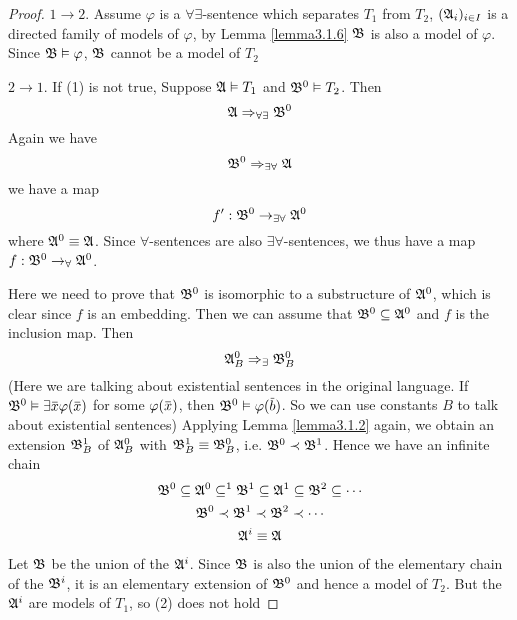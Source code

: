 \documentclass[11pt]{article}
\begin{document}
\begin{proof}
\(1\to 2\). Assume \(\varphi\) is a \(\forall\exists\)-sentence which separates \(T_1\) from \(T_2\), \((\mathfrak{A}_i)_{i\in I}\) is a
directed family of models of \(\varphi\), by Lemma \ref{lemma3.1.6} \(\mathfrak{B}\) is also a model of \(\varphi\).
Since \(\mathfrak{B}\vDash\varphi\), \(\mathfrak{B}\) cannot be a model of \(T_2\)

\(2\to1\). If (1) is not true, Suppose \(\mathfrak{A}\vDash T_1\) and \(\mathfrak{B}^0\vDash T_2\). Then
\begin{equation*}
\mathfrak{A}\Rightarrow_{\forall\exists}\mathfrak{B}^0
\end{equation*}
Again we have
\begin{equation*}
\mathfrak{B}^0\Rightarrow_{\exists\forall}\mathfrak{A}
\end{equation*}
we have a map
\begin{equation*}
f':\mathfrak{B}^0\to_{\exists\forall}\mathfrak{A}^0
\end{equation*}
where \(\mathfrak{A}^0\equiv\mathfrak{A}\). Since \(\forall\)-sentences are also \(\exists\forall\)-sentences, we thus have a map \(f:\mathfrak{B}^0\to_{\forall}\mathfrak{A}^0\).

Here we need to prove that \(\mathfrak{B}^0\) is isomorphic to a substructure of \(\mathfrak{A}^0\), which is clear
since \(f\) is an embedding.
Then we can assume that \(\mathfrak{B}^0\subseteq\mathfrak{A}^0\) and \(f\) is the inclusion map. Then
\begin{equation*}
\mathfrak{A}_B^0\Rightarrow_\exists\mathfrak{B}_B^0
\end{equation*}
(Here we are talking about existential sentences in the original language.
 If \(\fB^0\vDash\exists\barx\varphi(\barx)\) for some \(\varphi(\barx)\), then \(\fB^0\vDash\varphi(\barb)\). So we can use constants
 \(B\) to talk about existential sentences)
 Applying Lemma \ref{lemma3.1.2} again, we obtain an extension \(\mathfrak{B}_B^1\) of
 \(\mathfrak{A}_B^0\) with \(\mathfrak{B}_B^1\equiv\mathfrak{B}_B^0\), i.e. \(\mathfrak{B}^0\prec\mathfrak{B}^1\). Hence we
 have an infinite chain
\begin{gather*}
\mathfrak{B}^0\subseteq\mathfrak{A}^0\subseteq^1\mathfrak{B}^1\subseteq\mathfrak{A}^1\subseteq\mathfrak{B}^2\subseteq\cdots\\
\mathfrak{B}^0\prec\mathfrak{B}^1\prec\mathfrak{B}^2\prec\cdots\\
\mathfrak{A}^i\equiv\mathfrak{A}
\end{gather*}
Let \(\mathfrak{B}\) be the union of the \(\mathfrak{A}^i\).  Since \(\mathfrak{B}\) is also the union
of the elementary chain of the \(\mathfrak{B}^i\), it is an elementary extension of
\(\mathfrak{B}^0\) and hence a model of \(T_2\). But the \(\mathfrak{A}^i\) are models of
\(T_1\), so (2) does not hold
\end{proof}
\end{document}
